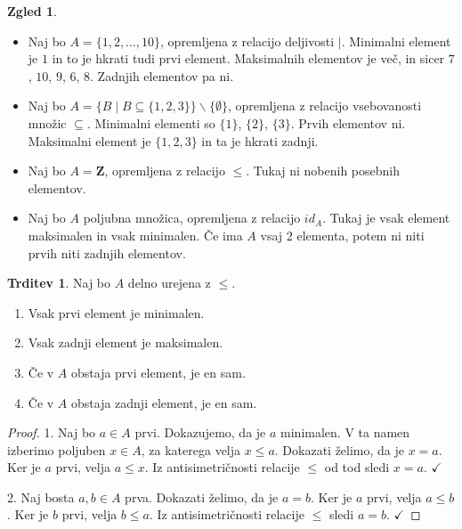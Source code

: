 \documentclass[11pt]{book}
\def\ZZ{\mathbf{Z}}
\def\kljuka{$\checkmark$}
\theoremstyle{definition}
\theoremstyle{zgled}
\newtheorem*{zgled}{Zgled}
\theoremstyle{odprtproblem}
\theoremstyle{domacanaloga}
\newenvironment{dokaz}
    {\color{siva}\begin{proof}}
    {\end{proof}}
\theoremstyle{izrek}
\newtheorem*{trditev}{Trditev}
\begin{document}
\begin{zgled} \leavevmode
\begin{itemize}
    \item Naj bo $A = \{ 1, 2, \dots, 10 \}$, opremljena z relacijo deljivosti $|$. Minimalni element je $1$ in to je hkrati tudi prvi element. Maksimalnih elementov je več, in sicer $7$, $10$, $9$, $6$, $8$. Zadnjih elementov pa ni.
    \item Naj bo $A = \{ B \mid B \subseteq \{ 1, 2, 3 \} \} \backslash \{ \emptyset \}$, opremljena z relacijo vsebovanosti množic $\subseteq$. Minimalni elementi so $\{ 1 \}$, $\{ 2 \}$, $\{ 3 \}$. Prvih elementov ni. Maksimalni element je $\{ 1, 2, 3 \}$ in ta je hkrati zadnji.
    \item Naj bo $A = \ZZ$, opremljena z relacijo $\leq$. Tukaj ni nobenih posebnih elementov.
    \item Naj bo $A$ poljubna množica, opremljena z relacijo $id_A$. Tukaj je vsak element maksimalen in vsak minimalen. Če ima $A$ vsaj $2$ elementa, potem ni niti prvih niti zadnjih elementov.
\end{itemize}
\end{zgled}

\begin{trditev}
Naj bo $A$ delno urejena z $\leq$.
\begin{enumerate}
    \item Vsak prvi element je minimalen.
    \item Vsak zadnji element je maksimalen.
    \item Če v $A$ obstaja prvi element, je en sam.
    \item Če v $A$ obstaja zadnji element, je en sam.
\end{enumerate}
\end{trditev}
\begin{dokaz}
1. Naj bo $a \in A$ prvi. Dokazujemo, da je $a$ minimalen. V ta namen izberimo poljuben $x \in A$, za katerega velja $x \leq a$. Dokazati želimo, da je $x = a$. Ker je $a$ prvi, velja $a \leq x$. Iz antisimetričnosti relacije $\leq$ od tod sledi $x = a$. \kljuka

2. Naj bosta $a,b \in A$ prva. Dokazati želimo, da je $a = b$. Ker je $a$ prvi, velja $a \leq b$. Ker je $b$ prvi, velja $b \leq a$. Iz antisimetričnosti relacije $\leq$ sledi $a = b$. \kljuka
\end{dokaz}
\end{document}
